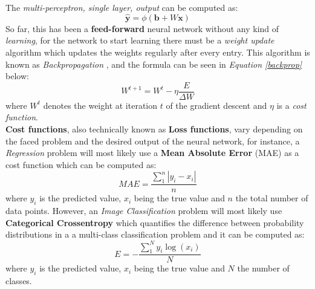 \documentclass[12pt]{extarticle}
\begin{document}
	The \emph{multi-perceptron, single layer, output} can be computed as:
	\begin{equation}\label{y_hat}
		\bm{\hat{y}} = \phi(\bm{b}+ W\bm{x})
	\end{equation}
	So far, this has been a \textbf{feed-forward} neural network without any kind of \emph{learning}, for the network to start learning there must be a \emph{weight update} algorithm which updates the weights regularly after every entry. This algorithm is known as \emph{Backpropagation} \cite{backprop}, and the formula can be seen in \emph{Equation \ref{backprop}} below: 
	\begin{equation}\label{backprop}
		W^{t+1} = W^{t} - \eta\dfrac{E}{\Delta{W}}
	\end{equation}
	where $W^{t}$ denotes the weight at iteration $t$ of the gradient descent and $\eta$ is a \emph{cost function}.\\[5mm]
	\textbf{Cost functions}, also technically known as \textbf{Loss functions}, vary depending on the faced problem and the desired output of the neural network, for instance, a \emph{Regression} problem will most likely use a \textbf{Mean Absolute Error} (MAE)\cite{qi2020mean} as a cost function which can be computed as:
	\begin{equation}\label{MAE}
		MAE = \dfrac{\sum_{1}^{n}|y_i-x_i|}{n}
	\end{equation}
	where $y_i$ is the predicted value, $x_i$ being the true value and $n$ the total number of data points. However, an \emph{Image Classification} problem will most likely use \textbf{Categorical Crossentropy}\cite{ho2019real} which quantifies the difference between probability distributions in a a multi-class classification problem and it can be computed as:
	\begin{equation}\label{crossentro}
		E = -\dfrac{\sum_{1}^{N}y_i\log(x_i)}{N}
	\end{equation}
	where $y_i$ is the predicted value, $x_i$ being the true value and $N$ the number of classes.

	
\end{document}
